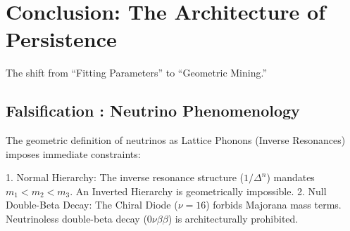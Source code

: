 \section{Conclusion: The Architecture of Persistence}

The shift from ``Fitting Parameters'' to ``Geometric Mining.''

\subsection{Falsification : Neutrino Phenomenology}

The geometric definition of neutrinos as Lattice Phonons (Inverse Resonances) imposes immediate constraints:

1. Normal Hierarchy: The inverse resonance structure ($1/\Delta^n$) mandates $m_1 < m_2 < m_3$. An Inverted Hierarchy is geometrically impossible.  
2. Null Double-Beta Decay: The Chiral Diode ($\nu=16$) forbids Majorana mass terms. Neutrinoless double-beta decay ($0\nu\beta\beta$) is architecturally prohibited.



